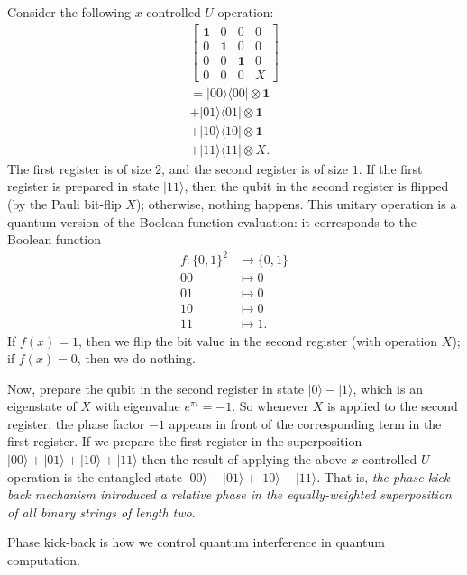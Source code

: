 \documentclass[fleqn]{article}
\newenvironment{idea}{\noindent}{\medskip}
\begin{document}
Consider the following \(x\)-controlled-\(U\) operation:
\[
  \begin{gathered}
    \left[
      \begin{array}{cccc}
        \mathbf{1}& 0 & 0 & 0
      \\0 & \mathbf{1}& 0 & 0
      \\0 & 0 & \mathbf{1}& 0
      \\0 & 0 & 0 & X
      \end{array}
    \right]
  \\[1em]
    =|00\rangle\langle 00|\otimes\mathbf{1}
  \\+ |01\rangle\langle 01|\otimes\mathbf{1}
  \\+ |10\rangle\langle 10|\otimes\mathbf{1}
  \\+ |11\rangle\langle 11|\otimes X.
  \end{gathered}
\]
The first register is of size \(2\), and the second register is of size \(1\).
If the first register is prepared in state \(|11\rangle\), then the qubit in the second register is flipped (by the Pauli bit-flip \(X\)); otherwise, nothing happens.
This unitary operation is a quantum version of the Boolean function evaluation: it corresponds to the Boolean function
\[
  \begin{aligned}
    f\colon\{0,1\}^2 &\to \{0,1\}
  \\00&\mapsto0
  \\01&\mapsto0
  \\10&\mapsto0
  \\11&\mapsto1.
  \end{aligned}
\]
If \(f(x)=1\), then we flip the bit value in the second register (with operation \(X\)); if \(f(x)=0\), then we do nothing.

Now, prepare the qubit in the second register in state \(|0\rangle-|1\rangle\), which is an eigenstate of \(X\) with eigenvalue \(e^{\pi i}=-1\).
So whenever \(X\) is applied to the second register, the phase factor \(-1\) appears in front of the corresponding term in the first register.
If we prepare the first register in the superposition \(|00\rangle+|01\rangle+|10\rangle+|11\rangle\) then the result of applying the above \(x\)-controlled-\(U\) operation is the entangled state \(|00\rangle+|01\rangle+|10\rangle-|11\rangle\).
That is, \emph{the phase kick-back mechanism introduced a relative phase in the equally-weighted superposition of all binary strings of length two}.

\begin{idea}

Phase kick-back is how we control quantum interference in quantum computation.

\end{idea}
\end{document}
